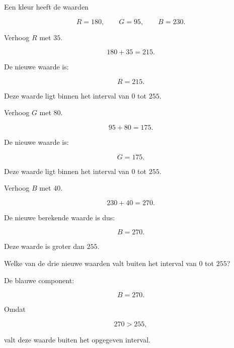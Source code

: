 \documentclass{ximera}
\begin{document}
\begin{oefening}{\oefU}

Een kleur heeft de waarden

\[
R=180,\qquad G=95,\qquad B=230.
\]

\begin{question}

Verhoog \(R\) met \(35\).

\begin{oplossing}

\[
180+35=215.
\]

De nieuwe waarde is:

\[
R=215.
\]

Deze waarde ligt binnen het interval van \(0\) tot \(255\).

\end{oplossing}

\end{question}


\begin{question}

Verhoog \(G\) met \(80\).

\begin{oplossing}

\[
95+80=175.
\]

De nieuwe waarde is:

\[
G=175.
\]

Deze waarde ligt binnen het interval van \(0\) tot \(255\).

\end{oplossing}

\end{question}


\begin{question}

Verhoog \(B\) met \(40\).

\begin{oplossing}

\[
230+40=270.
\]

De nieuwe berekende waarde is dus:

\[
B=270.
\]

Deze waarde is groter dan \(255\).

\end{oplossing}

\end{question}


\begin{question}

Welke van de drie nieuwe waarden valt buiten het interval van \(0\) tot
\(255\)?

\begin{oplossing}

De blauwe component:

\[
B=270.
\]

Omdat

\[
270>255,
\]

valt deze waarde buiten het opgegeven interval.

\end{oplossing}

\end{question}

\end{oefening}
\end{document}
